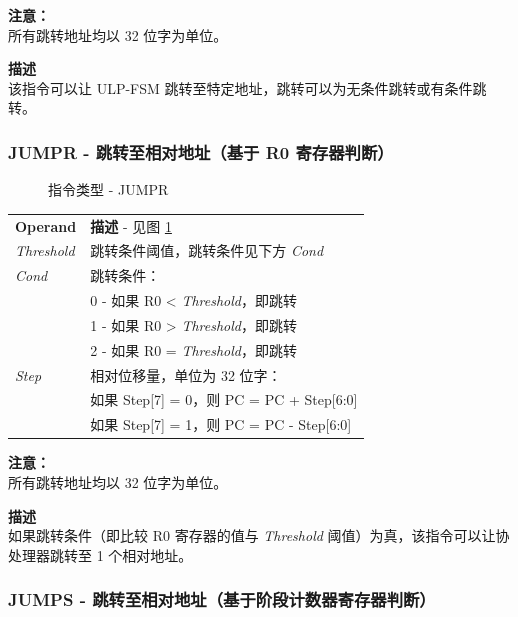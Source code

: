 \documentclass[main\_\_CN.tex]{subfiles}
\begin{document}
\textbf{注意：} \\
所有跳转地址均以 32 位字为单位。

\textbf{描述} \\
该指令可以让 ULP-FSM 跳转至特定地址，跳转可以为无条件跳转或有条件跳转。


\subsubsection{JUMPR - 跳转至相对地址（基于 R0 寄存器判断）}

%
%
%
%
%
\begin{figure}[H]
    \centering
    \caption{指令类型 - JUMPR}
    \label{fig:JUMPR}
\end{figure}

\vspace{-2em}
\begin{tabular}{ l l }
\textbf{Operand} & \textbf{描述} - 见图 \ref{fig:JUMPR} \\
\textit{Threshold} & 跳转条件阈值，跳转条件见下方 \textit{Cond}\\
\textit{Cond} & 跳转条件：\\
 & 0 - 如果 R0 < \textit{Threshold}，即跳转 \\
 & 1 - 如果 R0 > \textit{Threshold}，即跳转 \\
 & 2 - 如果 R0 = \textit{Threshold}，即跳转 \\
\textit{Step} & 相对位移量，单位为 32 位字：\\
 & 如果 Step[7] = 0，则 PC = PC + Step[6:0] \\
 & 如果 Step[7] = 1，则 PC = PC - Step[6:0] \\
\end{tabular}

\textbf{注意：} \\
所有跳转地址均以 32 位字为单位。

\textbf{描述} \\
如果跳转条件（即比较 R0 寄存器的值与 \textit{Threshold} 阈值）为真，该指令可以让协处理器跳转至 1 个相对地址。

\vspace{-2em}
\subsubsection{JUMPS - 跳转至相对地址（基于阶段计数器寄存器判断）}\label{para:jumps-to-relative-address}
\end{document}

